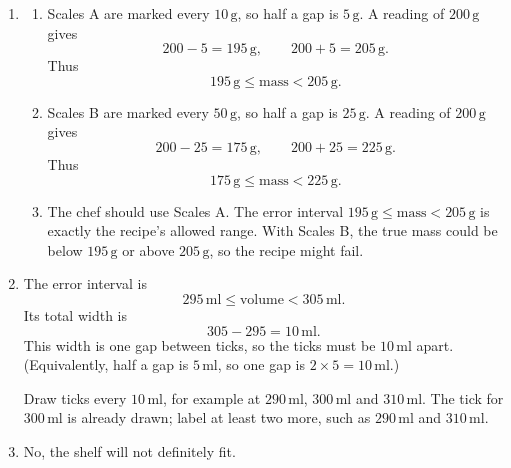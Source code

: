 \documentclass[11pt,a4paper]{article}
\begin{document}
\begin{enumerate}[label=\textbf{Q\arabic*.}, start=13, leftmargin=*, itemsep=8pt]
\item 
\begin{solbox}
\begin{enumerate}[label=(\alph*), leftmargin=*, itemsep=4pt]
\item Scales A are marked every \(10\,\text{g}\), so half a gap is \(5\,\text{g}\). A reading of \(200\,\text{g}\) gives
\[
200-5=195\,\text{g},\qquad 200+5=205\,\text{g}.
\]
Thus
\[
\boxed{195\,\text{g}\le \text{mass}<205\,\text{g}}.
\]
\item Scales B are marked every \(50\,\text{g}\), so half a gap is \(25\,\text{g}\). A reading of \(200\,\text{g}\) gives
\[
200-25=175\,\text{g},\qquad 200+25=225\,\text{g}.
\]
Thus
\[
\boxed{175\,\text{g}\le \text{mass}<225\,\text{g}}.
\]
\item The chef should use Scales A. The error interval \(195\,\text{g}\le \text{mass}<205\,\text{g}\) is exactly the recipe's allowed range. With Scales B, the true mass could be below \(195\,\text{g}\) or above \(205\,\text{g}\), so the recipe might fail.
\end{enumerate}
\end{solbox}

\item 
\begin{solbox}
The error interval is
\[
295\,\text{ml}\le \text{volume}<305\,\text{ml}.
\]
Its total width is
\[
305-295=10\,\text{ml}.
\]
This width is one gap between ticks, so the ticks must be \(10\,\text{ml}\) apart. (Equivalently, half a gap is \(5\,\text{ml}\), so one gap is \(2\times 5=10\,\text{ml}\).)

Draw ticks every \(10\,\text{ml}\), for example at \(290\,\text{ml}\), \(300\,\text{ml}\) and \(310\,\text{ml}\). The tick for \(300\,\text{ml}\) is already drawn; label at least two more, such as \(290\,\text{ml}\) and \(310\,\text{ml}\).

\smallskip
\begin{center}
\end{center}
\end{solbox}

\item 
\begin{solbox}
No, the shelf will not definitely fit.


\end{solbox}
\end{enumerate}
\end{document}
